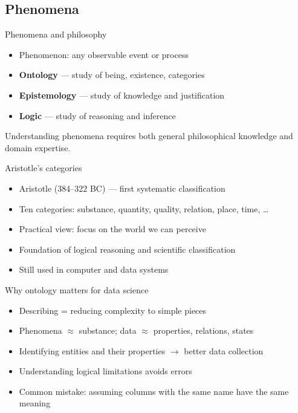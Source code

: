 \subsection{Phenomena}

\begin{frame}{Phenomena and philosophy}
  \begin{itemize}
    \item Phenomenon: any observable event or process
    \item \textbf{Ontology} --- study of being, existence, categories
    \item \textbf{Epistemology} --- study of knowledge and justification
    \item \textbf{Logic} --- study of reasoning and inference
  \end{itemize}

  \vspace{0.5cm}
  Understanding phenomena requires both general philosophical
  knowledge and domain expertise.
\end{frame}

\begin{frame}{Aristotle's categories}
  \begin{itemize}
    \item Aristotle (384--322 BC) --- first systematic classification
    \item Ten categories: substance, quantity, quality, relation, place, time, \ldots
    \item Practical view: focus on the world we can perceive
    \item Foundation of logical reasoning and scientific classification
    \item Still used in computer and data systems
  \end{itemize}
\end{frame}

\begin{frame}{Why ontology matters for data science}
  \begin{itemize}
    \item Describing = reducing complexity to simple pieces
    \item Phenomena $\approx$ substance; data $\approx$ properties, relations, states
    \item Identifying entities and their properties $\to$ better data collection
    \item Understanding logical limitations avoids errors
    \item Common mistake: assuming columns with the same name have the same meaning
  \end{itemize}
\end{frame}

